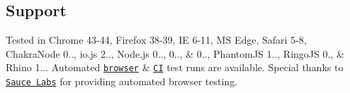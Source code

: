 \subsection*{Support}

Tested in Chrome 43-\/44, Firefox 38-\/39, I\+E 6-\/11, M\+S Edge, Safari 5-\/8, Chakra\+Node 0.., io.\+js 2.., Node.\+js 0.., 0.., \& 0.., Phantom\+J\+S 1.., Ringo\+J\+S 0., \& Rhino 1... Automated \href{https://saucelabs.com/u/lodash}{\tt browser} \& \href{https://travis-ci.org/lodash/lodash/}{\tt C\+I} test runs are available. Special thanks to \href{https://saucelabs.com/}{\tt Sauce Labs} for providing automated browser testing. 